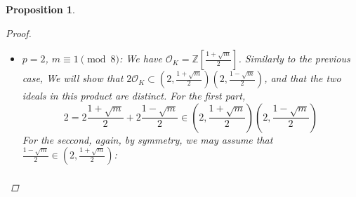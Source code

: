 \documentclass[11pt]{article}
\newtheorem{prop}{Proposition}
\theoremstyle{definition}
\begin{document}
\begin{prop}
\begin{proof}
\begin{itemize}
                We will show that $p\mathcal{O}_K \subset \left(p, n + \sqrt {m}\right)\left(p, n - \sqrt {m}\right)$,
                and that the two ideals in the product are distinct (by symmetry, this will imply that they are both proper ideals).
                For the first part, observe that $2np = p\left(n+\sqrt {m}\right) + p\left(n-\sqrt {m}\right)$
                is in the relevant ideal product. $p\nmid 2n$ so, by the Bezout identity, there exist $a, b \in \mathbb{Z}$ such that
                \[
                    ap + b(2n) = 1 \Rightarrow p = a\,(p^2) + b\,(2np) \in \left(p, n + \sqrt {m}\right)\left(p, n - \sqrt {m}\right)
                \]
                We will prove that the ideals are different by contradiction.
                Without loss of generality, we will assume that $n-\sqrt {m} \in \left(p, n+\sqrt {m}\right)$:
                \begin{align*}
                    n-\sqrt {m} = p\left(a+b\sqrt {m}\right) + \left(n+\sqrt {m}\right)\left(c+d\sqrt {m}\right) &= (ap+cn+dm) + (bp+nd+c)\sqrt {m}\\
                    \intertext{Equating terms, we get}
                    bp+nd+c &= -1 \\
                    ap+cn+dm &= n \\
                    \intertext{Now, working modulo $p$, and multiplying the first equation by $n$, we get}
                    md + nc &\equiv -n\\
                    cn + dm &\equiv n
                \end{align*}
                Subtracting the first equation from the second, we get $p \mid 2n \Rightarrow p \mid n$, against our assumptions.
                \item $p=2$, $m \equiv 1 \pmod 8$: We have $\mathcal{O}_K = \mathbb{Z}\left[\frac{1+\sqrt {m}}{2}\right]$.
                Similarly to the previous case,
                We will show that
                $2\mathcal{O}_K \subset \left(2, \frac{1 + \sqrt {m}}{2}\right)\left(2, \frac{1 - \sqrt {m}}{2}\right)$,
                and that the two ideals in this product are distinct.
                For the first part,
                \[2 = 2\frac{1 + \sqrt {m}}{2} + 2\frac{1 - \sqrt {m}}{2} \in \left(2, \frac{1 + \sqrt {m}}{2}\right)\left(2, \frac{1 - \sqrt {m}}{2}\right)\]
                For the seccond, again, by symmetry, we may assume that
                $\frac{1 - \sqrt {m}}{2} \in \left(2, \frac{1 + \sqrt {m}}{2}\right)$:
                \begin{gather*}

\end{gather*}
\end{itemize}
\end{proof}
\end{prop}
\end{document}
